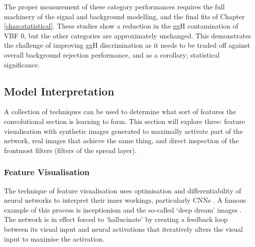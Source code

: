 The proper measurement of these category performances requires the full machinery of the signal and background modelling, and the final fits of Chapter \ref{chap:statistical}.
These studies show a reduction in the ggH contamination of VBF 0, but the other categories are approximately unchanged. 
This demonstrates the challenge of improving ggH discrimination as it needs to be traded off against overall background rejection performance, and as a corollary; statistical significance.









\subsection{Model Interpretation}
A collection of techniques can be used to determine what sort of features the convolutional section is learning to form.
This section will explore three: feature visualisation with synthetic images generated to maximally activate part of the network, real images that achieve the same thing, and direct inspection of the frontmost filters (filters of the spread layer).



\subsubsection{Feature Visualisation}
The technique of feature visualisation uses optimisation and differentiability of neural networks to interpret their inner workings, particularly CNNs \cite{FeatureVis}. A famous example of this process is inceptionism and the so-called `deep dream' images \cite{Inceptionism}. The network is in effect forced to `hallucinate' by creating a feedback loop between its visual input and neural activations that iteratively alters the visual input to maximise the activation.

